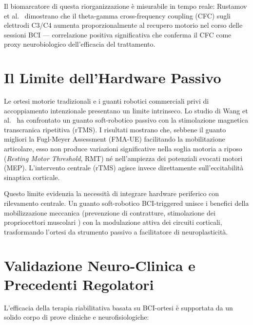 \documentclass[a4paper,11pt]{article}
\begin{document}
Il biomarcatore di questa riorganizzazione è misurabile in tempo reale:
Rustamov et al.\ \cite{rustamov2025ipsihand} dimostrano che il theta-gamma
cross-frequency coupling (CFC) sugli elettrodi C3/C4 aumenta proporzionalmente
al recupero motorio nel corso delle sessioni BCI — correlazione positiva
significativa che conferma il CFC come proxy neurobiologico dell'efficacia
del trattamento.

\section{Il Limite dell'Hardware Passivo}
Le ortesi motorie tradizionali e i guanti robotici commerciali privi di accoppiamento
intenzionale presentano un limite intrinseco. Lo studio di Wang et al.\
\cite{wang2023effectiveness} ha confrontato un guanto soft-robotico passivo con
la stimolazione magnetica transcranica ripetitiva (rTMS). I risultati mostrano che,
sebbene il guanto migliori la Fugl-Meyer Assessment (FMA-UE) facilitando la
mobilitazione articolare, esso non produce variazioni significative nella soglia
motoria a riposo (\textit{Resting Motor Threshold}, RMT) né nell'ampiezza dei
potenziali evocati motori (MEP). L'intervento centrale (rTMS) agisce invece
direttamente sull'eccitabilità sinaptica corticale.

Questo limite evidenzia la necessità di integrare hardware periferico con rilevamento
centrale. Un guanto soft-robotico BCI-triggered unisce i benefici della mobilizzazione
meccanica (prevenzione di contratture, stimolazione dei propriocettori muscolari
\cite{osuagwu2020home}) con la modulazione attiva dei circuiti corticali, trasformando
l'ortesi da strumento passivo a facilitatore di neuroplasticità.

\section{Validazione Neuro-Clinica e Precedenti Regolatori}
L'efficacia della terapia riabilitativa basata su BCI-ortesi è supportata da un
solido corpo di prove cliniche e neurofisiologiche:
\end{document}
